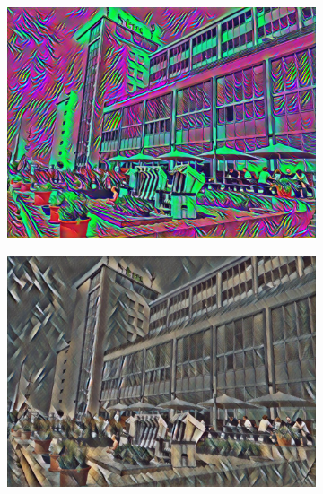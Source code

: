 \begin{figure}[H]
\begin{subfigure}[h]{0.13\textwidth}
        \includegraphics[width=\textwidth]{resources/content/experiments/htw-vgg16_multicolored_abstract_artwork.jpg}
    \end{subfigure}
    \begin{subfigure}[h]{0.13\textwidth}
        \centering
        \includegraphics[width=\textwidth]{resources/content/experiments/htw-vgg16_still_life_with_liqueur_bottle.jpg}
    \end{subfigure}
    \begin{subfigure}[h]{0.13\textwidth}
        \centering

\end{subfigure}
\end{figure}
